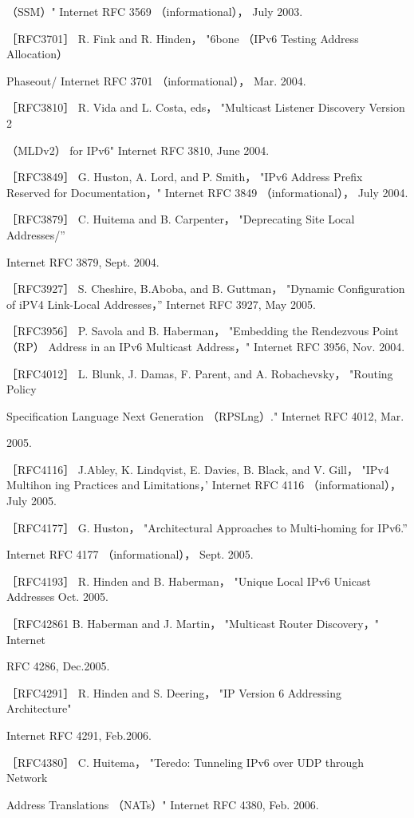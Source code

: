（SSM）" Internet RFC 3569 （informational）， July 2003.

［RFC3701］ R. Fink and R. Hinden， "6bone （IPv6 Testing Address Allocation）

Phaseout/ Internet RFC 3701 （informational）， Mar. 2004.

［RFC3810］ R. Vida and L. Costa, eds， "Multicast Listener Discovery Version 2

（MLDv2） for IPv6" Internet RFC 3810, June 2004.

［RFC3849］ G. Huston, A. Lord, and P. Smith， "IPv6 Address Prefix Reserved for
Documentation，" Internet RFC 3849 （informational）， July 2004.

［RFC3879］ C. Huitema and B. Carpenter， "Deprecating Site Local Addresses/”

Internet RFC 3879, Sept. 2004.

［RFC3927］ S. Cheshire, B.Aboba, and B. Guttman， "Dynamic Configuration of
iPV4 Link-Local Addresses，” Internet RFC 3927, May 2005.

［RFC3956］ P. Savola and B. Haberman， "Embedding the Rendezvous Point （RP）
Address in an IPv6 Multicast Address，" Internet RFC 3956, Nov. 2004.

［RFC4012］ L. Blunk, J. Damas, F. Parent, and A. Robachevsky， "Routing Policy

Specification Language Next Generation （RPSLng）." Internet RFC 4012, Mar.

2005.

［RFC4116］ J.Abley, K. Lindqvist, E. Davies, B. Black, and V. Gill， "IPv4 Multihon
ing Practices and Limitations，' Internet RFC 4116 （informational）， July 2005.

［RFC4177］ G. Huston， "Architectural Approaches to Multi-homing for IPv6.”

Internet RFC 4177 （informational）， Sept. 2005.

［RFC4193］ R. Hinden and B. Haberman， "Unique Local IPv6 Unicast Addresses
Oct. 2005.

［RFC42861 B. Haberman and J. Martin， "Multicast Router Discovery，" Internet

RFC 4286, Dec.2005.

［RFC4291］ R. Hinden and S. Deering， "IP Version 6 Addressing Architecture"

Internet RFC 4291, Feb.2006.

［RFC4380］ C. Huitema， "Teredo: Tunneling IPv6 over UDP through Network

Address Translations （NATs）" Internet RFC 4380, Feb. 2006.

